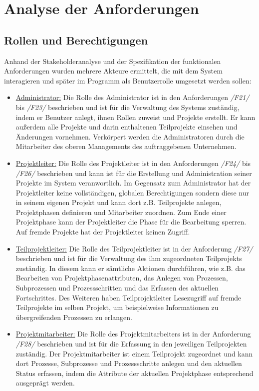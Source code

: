 \section{Analyse der Anforderungen}
\subsection{Rollen und Berechtigungen}
Anhand der Stakeholderanalyse und der Spezifikation der funktionalen Anforderungen wurden mehrere Akteure ermittelt, die mit dem System interagieren und später im Programm als Benutzerrolle umgesetzt werden sollen:
\begin{itemize}
    \item[] \underline{Administrator:} Die Rolle des Administrator ist in den Anforderungen \emph{/F21/} bis \emph{/F23/} beschrieben und ist für die Verwaltung des Systems zuständig, indem er Benutzer anlegt, ihnen Rollen zuweist und Projekte erstellt. Er kann außerdem alle Projekte und darin enthaltenen Teilprojekte einsehen und Änderungen vornehmen. Verkörpert werden die Administratoren durch die Mitarbeiter des oberen Managements des auftraggebenen Unternehmen.
    
    \item[] \underline{Projektleiter:} Die Rolle des Projektleiter ist in den Anforderungen \emph{/F24/} bis \emph{/F26/} beschrieben und kann ist für die Erstellung und Administration seiner Projekte im System veranwortlich. Im Gegensatz zum Administrator hat der Projektleiter keine vollständigen, globalen Berechtigungen sondern diese nur in seinem eigenen Projekt und kann dort z.B. Teilprojekte anlegen, Projektphasen definieren und Mitarbeiter zuordnen. Zum Ende einer Projektphase kann der Projektleiter die Phase für die Bearbeitung sperren. Auf fremde Projekte hat der Projektleiter keinen Zugriff. 
    
    \item[] \underline{Teilprojektleiter:} Die Rolle des Teilprojektleiter ist in der Anforderung \emph{/F27/} beschrieben und ist für die Verwaltung des ihm zugeordneten Teilprojekts zuständig. In diesem kann er sämtliche Aktionen durchführen, wie z.B. das Bearbeiten von Projektphasenattributen, das Anlegen von Prozessen, Subprozessen und Prozessschritten und das Erfassen des aktuellen Fortschrittes. Des Weiteren haben Teilprojektleiter Lesezugriff auf fremde Teilprojekte im selben Projekt, um beispielweise Informationen zu übergreifenden Prozessen zu erlangen.

    \item[] \underline{Projektmitarbeiter:} Die Rolle des Projektmitarbeiters ist in der Anforderung \emph{/F28/} beschrieben und ist für die Erfassung in den jeweiligen Teilprojekten zuständig. Der Projektmitarbeiter ist einem Teilprojekt zugeordnet und kann dort Prozesse, Subprozesse und Prozessschritte anlegen und den aktuellen Status erfassen, indem die Attribute der aktuellen Projektphase entsprechend ausgeprägt werden.


\end{itemize}
